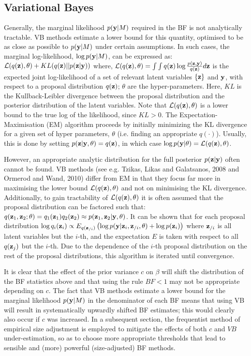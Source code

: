 \documentclass[12pt,epsf]{article}
\begin{document}
\subsection{Variational Bayes}
\label{sec:VB}
Generally, the marginal likelihood $p(\mathbf{y}|M)$ required in the BF is not analytically tractable. VB methods estimate a
lower bound for this quantity, optimised to be as close as possible to $p(\mathbf{y}|M)$ under certain assumptions. In such cases, the
marginal log-likelihood, $\log p(\mathbf{y}|M)$, can be expressed as:
$\mathcal{L}(q(\mathbf{z}),\theta)+KL(q(\mathbf{z})||p(\mathbf{z}|\mathbf{y}))$ where, $\mathcal{L}(q(\mathbf{z}),\theta)=\int\int q(\mathbf{z})\log\frac{p(\mathbf{z},\mathbf{y})}{q(\mathbf{z})}d\mathbf{z}$ is
the expected joint log-likelihood of a set of relevant latent variables $\{\mathbf{z}\}$ and $\mathbf{y}$, with respect to a proposal
distribution $q(\mathbf{z})$; $\theta$ are the hyper-parameters.
Here, $KL$ is the Kullback-Leibler divergence between the proposal distribution and the posterior distribution of the latent variables.
Note that $\mathcal{L}(q(\mathbf{z}),\theta)$ is a lower bound to the true log of the likelihood, since $KL>0$.
The Expectation-Maximisation (EM) algorithm proceeds by initially minimizing the KL divergence for a given set of hyper parameters,
$\theta$ (i.e. finding an appropriate $q(\cdot)$). Usually, this is done by setting $p(\mathbf{z}|\mathbf{y},\theta)=q(\mathbf{z})$, in which
case $\log p(\mathbf{y}|\theta)=\mathcal{L}(q(\mathbf{z}),\theta)$.

However, an appropriate analytic distribution for the full posterior $p(\mathbf{z}|\mathbf{y})$ often cannot be found. VB methods
(see e.g. Tzikas, Likas and Galatsanos, 2008 and Ormerod and Wand, 2010) differ from EM in that they focus far
more in maximising the lower bound $\mathcal{L}(q(\mathbf{z}),\theta)$ and not on minimising the KL divergence. Additionally, to gain
tractability of $\mathcal{L}(q(\mathbf{z}),\theta)$ it is often assumed that the proposal distribution can be factored such that:
$q(\mathbf{z}_1,\mathbf{z}_2;\theta)=q_1(\mathbf{z}_1)q_2(\mathbf{z}_2)\approx p(\mathbf{z}_1,\mathbf{z}_2|\mathbf{y},\theta)$.
It can be shown that for each proposal distribution
$\log q_i(\mathbf{z}_i) \propto E_{q(\mathbf{z}_{/i})}\left(\log p(\mathbf{y} | \mathbf{z}_i,\mathbf{z}_{/i},\theta)+\log p(\mathbf{z}_i)\right)$ where $\mathbf{z}_{/i}$ is all latent
variables but the $i$-th, and the expectation $E$ is taken with respect to all $q(\mathbf{z}_j)$ but the $i$-th. Due to the dependence
of the $i$-th proposal distribution on the rest of the proposal distributions, this algorithm is iterated until convergence.

It is clear that the effect of the prior variance $c$ on $\beta$ will shift the distribution of the BF statistics above and
that using the rule $BF<1$ may not be appropriate depending on $c$. The fact that VB methods estimate a lower bound for the
marginal likelihood $p(\mathbf{y}|M)$ in the denominator of each BF means that using VB will result in systematically upwardly shifted BF estimates;
this would clearly also occur if $c$ was increased. In a subsequent section, the frequentist method of empirical size adjustment is employed
to mitigate the effects of both $c$ and $VB$ under-estimation, so as to choose more appropriate thresholds that lead to sensible and
(more) powerful (size-adjusted) BF methods.
\end{document}
